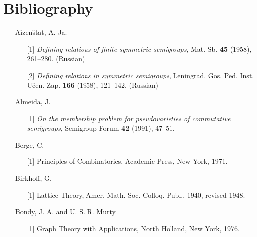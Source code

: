 \documentclass{surv-l}
\numberwithin{equation}{section}
\numberwithin{table}{section}
\numberwithin{figure}{section}
\theoremstyle{definition}
\begin{document}
\chapter*{Bibliography}

\begin{enumerate}

\item[] A\u{\i}zen\u{s}tat, A. Ja.

\begin{enumerate}
\item[\hypertarget{bib1}{[1]}] \emph{Defining relations of finite symmetric
semigroups}, Mat. Sb. \textbf{45} (1958), 261--280.
(Russian)

\item[\hypertarget{bib1a}{[2]}] \emph{Defining relations in symmetric semigroups},
Leningrad. Gos. Ped. Inst. U\u{c}en. Zap. \textbf{166}
(1958), 121--142. (Russian)
\end{enumerate}

\item[] Almeida, J.

\begin{enumerate}
\item[\hypertarget{bib2}{[1]}] \emph{On the membership problem for pseudovarieties of
commutative semigroups}, Semigroup Forum \textbf{42}
(1991), 47--51.
\end{enumerate}

\item[] Berge, C.

\begin{enumerate}
\item[\hypertarget{bib3}{[1]}] Principles of Combinatorics, Academic Press, New York,
1971.
\end{enumerate}

\item[] Birkhoff, G.
\begin{enumerate}
\item[\hypertarget{bib4}{[1]}] Lattice Theory, Amer. Math. Soc. Colloq. Publ., 1940,
revised 1948.
\end{enumerate}

\item[] Bondy, J. A. and U. S. R. Murty
\begin{enumerate}
\item[\hypertarget{bib5}{[1]}] Graph Theory with Applications, North Holland, New York,
1976.
\end{enumerate}


\end{enumerate}
\end{document}
